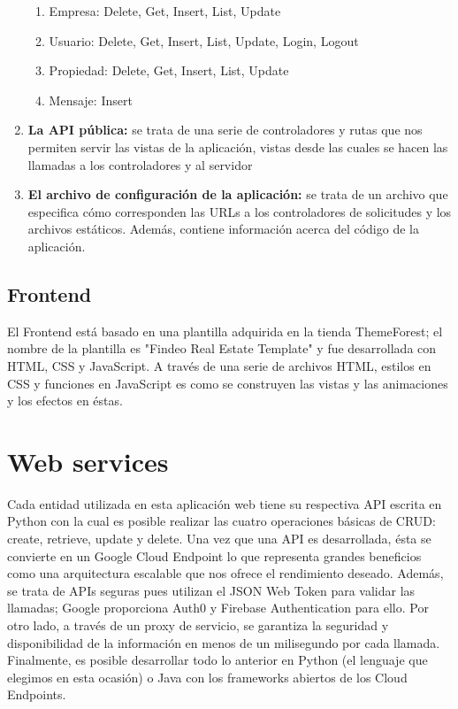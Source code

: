 \documentclass[12pt]{article}
\begin{document}
\begin{enumerate}
\begin{enumerate}
    \item Empresa: Delete, Get, Insert, List, Update
    \item Usuario: Delete, Get, Insert, List, Update, Login, Logout
    \item Propiedad: Delete, Get, Insert, List, Update
    \item Mensaje: Insert
\end{enumerate}
\item \textbf{La API pública:} se trata de una serie de controladores y rutas que nos permiten servir las vistas de la aplicación, vistas desde las cuales se hacen las llamadas a los controladores y al servidor
\item \textbf{El archivo de configuración de la aplicación:} se trata de un archivo que especifica cómo corresponden las URLs a los controladores de solicitudes y los archivos estáticos. Además, contiene información acerca del código de la aplicación.
\end{enumerate}

\subsection{Frontend}

El Frontend está basado en una plantilla adquirida en la tienda ThemeForest; el nombre de la plantilla es "Findeo Real Estate Template" y fue desarrollada con HTML, CSS y JavaScript. A través de una serie de archivos HTML, estilos en CSS y funciones en JavaScript es como se construyen las vistas y las animaciones y los efectos en éstas.

\section{Web services}

Cada entidad utilizada en esta aplicación web tiene su respectiva API escrita en Python con la cual es posible realizar las cuatro operaciones básicas de CRUD: create, retrieve, update y delete. Una vez que una API es desarrollada, ésta se convierte en un Google Cloud Endpoint lo que representa grandes beneficios como una arquitectura escalable que nos ofrece el rendimiento deseado. Además, se trata de APIs seguras pues utilizan el JSON Web Token para validar las llamadas; Google proporciona Auth0 y Firebase Authentication para ello. Por otro lado, a través de un proxy de servicio, se garantiza la seguridad y disponibilidad de la información en menos de un milisegundo por cada llamada. Finalmente, es posible desarrollar todo lo anterior en Python (el lenguaje que elegimos en esta ocasión) o Java con los frameworks abiertos de los Cloud Endpoints.
\end{document}
